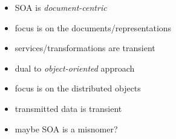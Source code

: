 \documentclass{sepslide-soa-faked} %
\begin{document}
\begin{slide}
\begin{itemize}
\item SOA is \emph{document-centric}
\item focus is on the documents/representations
\item services/transformations are transient
\medskip
\item dual to \emph{object-oriented} approach
\item focus is on the distributed objects
\item transmitted data is transient
\medskip
\item maybe SOA is a misnomer?
\end{itemize}
\end{slide}

\begin{slide}
  \Listofslides
\end{slide}

\begin{slide}
  \Timetable
\end{slide}
\end{document}
